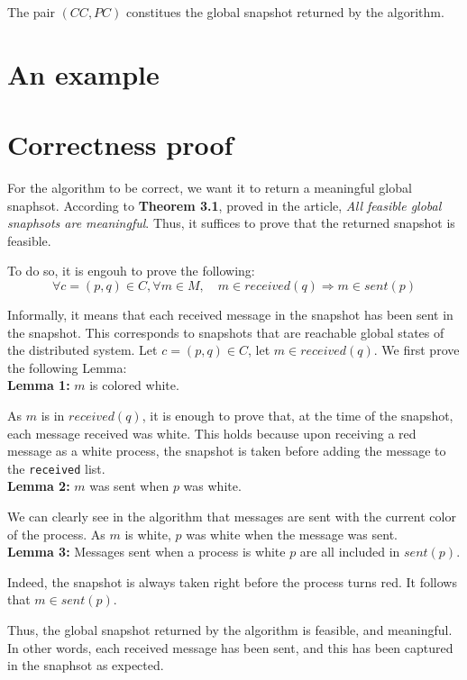 \documentclass{article}
\begin{document}
The pair $(CC,PC)$ constitues the global snapshot returned by the algorithm.

\section{An example}

\section{Correctness proof}

For the algorithm to be correct, we want it to return a meaningful global snaphsot.
According to \textbf{Theorem 3.1}, proved in the article, \textit{All feasible global snaphsots are meaningful}.
Thus, it suffices to prove that the returned snapshot is feasible.

To do so, it is engouh to prove the following:
$$\forall c=(p,q)\in C, \forall m\in M,\quad m\in\mathit{received}(q)\Rightarrow m\in\mathit{sent}(p)$$

Informally, it means that each received message in the snapshot has been sent in the snapshot. This corresponds to snapshots that are reachable global states of the distributed system.
Let $c=(p,q)\in C$, let $m\in\mathit{received}(q)$.
We first prove the following Lemma:\\
\textbf{Lemma 1:} $m$ is colored white.

As $m$ is in $\mathit{received}(q)$, it is enough to prove that, at the time of the snapshot, each message received was white. This holds because upon receiving a red message as a white process, the snapshot is taken before adding the message to the \lstinline{received} list.\\
\textbf{Lemma 2:} $m$ was sent when $p$ was white.

We can clearly see in the algorithm that messages are sent with the current color of the process. As $m$ is white, $p$ was white when the message was sent.\\
\textbf{Lemma 3:} Messages sent when a process is white $p$ are all included in $\mathit{sent}(p)$.

Indeed, the snapshot is always taken right before the process turns red.
It follows that $m\in\mathit{sent}(p)$.

Thus, the global snapshot returned by the algorithm is feasible, and meaningful.
In other words, each received message has been sent, and this has been captured in the snaphsot as expected.
\end{document}
